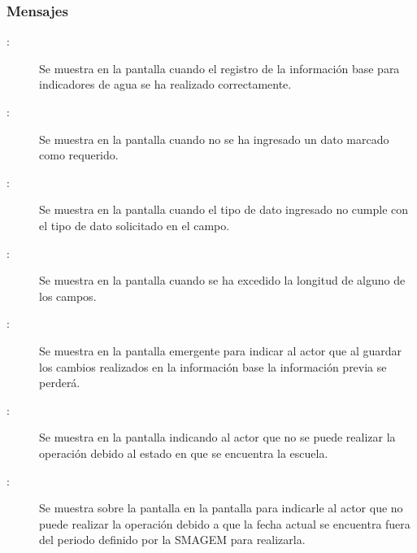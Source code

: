 \subsubsection{Mensajes}

    \begin{description}
	  \item [:] Se muestra en la pantalla  cuando el registro de la información base para indicadores de agua se ha realizado correctamente.
	    
	  \item [:] Se muestra en la pantalla  cuando no se ha ingresado un dato marcado como requerido.
	    
	  \item  [:] Se muestra en la pantalla  cuando el tipo de dato ingresado no cumple con el tipo de dato solicitado en el campo.
	    
	  \item [:] Se muestra en la pantalla  cuando se ha excedido la longitud de alguno de los campos.	    
	    
	   \item  [:] Se muestra en la pantalla emergente  para indicar al actor que al guardar los cambios realizados en la información base la información previa se perderá.  
	   
	   \item[:] Se muestra en la pantalla  indicando al actor que no se puede realizar la operación debido al estado en que se encuentra la escuela.
	   
	   \item [:] Se muestra sobre la pantalla en la pantalla  para indicarle al actor que no puede realizar la operación debido a que la fecha actual se encuentra fuera del periodo definido por la SMAGEM para realizarla.
    \end{description}
